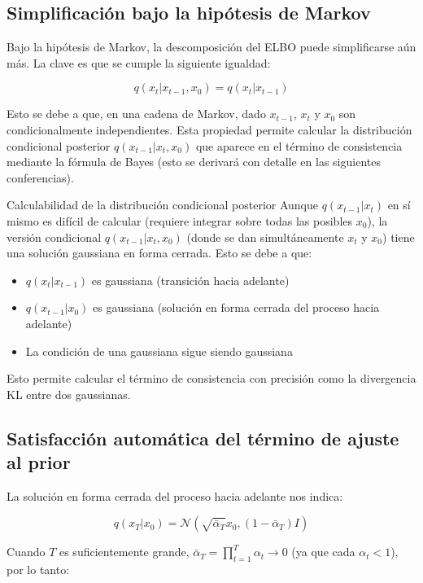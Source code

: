 \documentclass[a4paper]{article}
\begin{document}
\subsection{Simplificación bajo la hipótesis de Markov}

Bajo la hipótesis de Markov, la descomposición del ELBO puede simplificarse aún más. La clave es que se cumple la siguiente igualdad:

$$q(x_t | x_{t-1}, x_0) = q(x_t | x_{t-1})$$

Esto se debe a que, en una cadena de Markov, dado $x_{t-1}$, $x_t$ y $x_0$ son condicionalmente independientes. Esta propiedad permite calcular la distribución condicional posterior $q(x_{t-1}|x_t, x_0)$ que aparece en el término de consistencia mediante la fórmula de Bayes (esto se derivará con detalle en las siguientes conferencias).

\begin{knowledgebox}{Calculabilidad de la distribución condicional posterior}
Aunque $q(x_{t-1}|x_t)$ en sí mismo es difícil de calcular (requiere integrar sobre todas las posibles $x_0$), la versión condicional $q(x_{t-1}|x_t, x_0)$ (donde se dan simultáneamente $x_t$ y $x_0$) tiene una solución gaussiana en forma cerrada. Esto se debe a que:
\begin{itemize}
    \item $q(x_t|x_{t-1})$ es gaussiana (transición hacia adelante)
    \item $q(x_{t-1}|x_0)$ es gaussiana (solución en forma cerrada del proceso hacia adelante)
    \item La condición de una gaussiana sigue siendo gaussiana
\end{itemize}
Esto permite calcular el término de consistencia con precisión como la divergencia KL entre dos gaussianas.
\end{knowledgebox}

\subsection{Satisfacción automática del término de ajuste al prior}

La solución en forma cerrada del proceso hacia adelante nos indica:

$$q(x_T | x_0) = \mathcal{N}(\sqrt{\bar{\alpha}_T} x_0, (1-\bar{\alpha}_T) I)$$

Cuando $T$ es suficientemente grande, $\bar{\alpha}_T = \prod_{t=1}^T \alpha_t \to 0$ (ya que cada $\alpha_t < 1$), por lo tanto:
\end{document}
